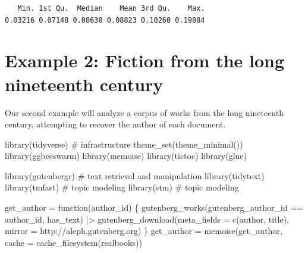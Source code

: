 \documentclass[
]{article}
\newenvironment{Shaded}{\begin{snugshade}}{\end{snugshade}}
\newcommand{\AttributeTok}[1]{\textcolor[rgb]{0.40,0.45,0.13}{#1}}
\newcommand{\CommentTok}[1]{\textcolor[rgb]{0.37,0.37,0.37}{#1}}
\newcommand{\ControlFlowTok}[1]{\textcolor[rgb]{0.00,0.23,0.31}{#1}}
\newcommand{\FunctionTok}[1]{\textcolor[rgb]{0.28,0.35,0.67}{#1}}
\newcommand{\NormalTok}[1]{\textcolor[rgb]{0.00,0.23,0.31}{#1}}
\newcommand{\OtherTok}[1]{\textcolor[rgb]{0.00,0.23,0.31}{#1}}
\newcommand{\SpecialCharTok}[1]{\textcolor[rgb]{0.37,0.37,0.37}{#1}}
\newcommand{\StringTok}[1]{\textcolor[rgb]{0.13,0.47,0.30}{#1}}
\begin{document}
\begin{verbatim}
   Min. 1st Qu.  Median    Mean 3rd Qu.    Max. 
0.03216 0.07148 0.08638 0.08823 0.10260 0.19884 
\end{verbatim}

\hypertarget{sec-realbooks}{%
\section{Example 2: Fiction from the long nineteenth
century}\label{sec-realbooks}}

Our second example will analyze a corpus of works from the long
nineteenth century, attempting to recover the author of each document.

\begin{Shaded}
\begin{Highlighting}[]
\FunctionTok{library}\NormalTok{(tidyverse)            }\CommentTok{\# infrastructure}
\FunctionTok{theme\_set}\NormalTok{(}\FunctionTok{theme\_minimal}\NormalTok{())}
\FunctionTok{library}\NormalTok{(ggbeeswarm)}
\FunctionTok{library}\NormalTok{(memoise)}
\FunctionTok{library}\NormalTok{(tictoc)}
\FunctionTok{library}\NormalTok{(glue)}

\FunctionTok{library}\NormalTok{(gutenbergr)           }\CommentTok{\# text retrieval and manipulation}
\FunctionTok{library}\NormalTok{(tidytext)}
\FunctionTok{library}\NormalTok{(tmfast)               }\CommentTok{\# topic modeling}
\FunctionTok{library}\NormalTok{(stm)                  }\CommentTok{\# topic modeling}

\NormalTok{get\_author }\OtherTok{=} \ControlFlowTok{function}\NormalTok{(author\_id) \{}
    \FunctionTok{gutenberg\_works}\NormalTok{(gutenberg\_author\_id }\SpecialCharTok{==}\NormalTok{ author\_id, }
\NormalTok{                    has\_text) }\SpecialCharTok{|\textgreater{}} 
        \FunctionTok{gutenberg\_download}\NormalTok{(}\AttributeTok{meta\_fields =} \FunctionTok{c}\NormalTok{(}\StringTok{\textquotesingle{}author\textquotesingle{}}\NormalTok{, }\StringTok{\textquotesingle{}title\textquotesingle{}}\NormalTok{), }
                           \AttributeTok{mirror =} \StringTok{\textquotesingle{}http://aleph.gutenberg.org\textquotesingle{}}\NormalTok{)}
\NormalTok{\}}
\NormalTok{get\_author }\OtherTok{=} \FunctionTok{memoise}\NormalTok{(get\_author, }
                     \AttributeTok{cache =} \FunctionTok{cache\_filesystem}\NormalTok{(}\StringTok{\textquotesingle{}realbooks\textquotesingle{}}\NormalTok{))}
\end{Highlighting}
\end{Shaded}
\end{document}
